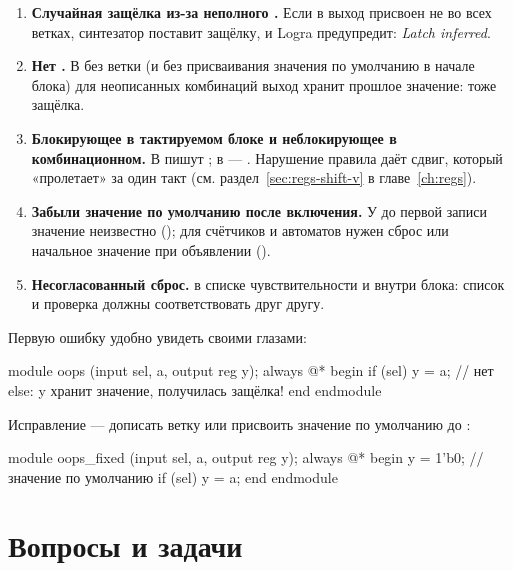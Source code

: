 \begin{warnbox}
\begin{enumerate}
  \item \textbf{Случайная защёлка из-за неполного .} Если в
         выход присвоен не во всех ветках, синтезатор
        поставит защёлку, и Logra предупредит: \emph{Latch inferred}.
  \item \textbf{Нет .} В  без ветки
         (и без присваивания значения по умолчанию в начале блока)
        для неописанных комбинаций выход хранит прошлое значение: тоже защёлка.
  \item \textbf{Блокирующее \code{=} в тактируемом блоке и неблокирующее
        \code{<=} в комбинационном.} В  пишут
        \code{<=}; в  --- \code{=}. Нарушение правила даёт
        сдвиг, который «пролетает» за один такт (см.
        раздел~\ref{sec:regs-shift-v} в главе~\ref{ch:regs}).
  \item \textbf{Забыли значение по умолчанию после включения.} У 
        до первой записи значение неизвестно (); для счётчиков и
        автоматов нужен сброс или начальное значение при объявлении
        ().
  \item \textbf{Несогласованный сброс.}  в
        списке чувствительности и  внутри блока: список
        и проверка должны соответствовать друг другу.
\end{enumerate}
\end{warnbox}

Первую ошибку удобно увидеть своими глазами:

\begin{vcode}
module oops (input sel, a, output reg y);
    always @* begin
        if (sel) y = a;      // нет else: y хранит значение, получилась защёлка!
    end
endmodule
\end{vcode}

Исправление --- дописать ветку или присвоить значение по умолчанию до
:

\begin{vcode}
module oops_fixed (input sel, a, output reg y);
    always @* begin
        y = 1'b0;            // значение по умолчанию
        if (sel) y = a;
    end
endmodule
\end{vcode}

\section{Вопросы и задачи}
\label{sec:tasks-ff}

